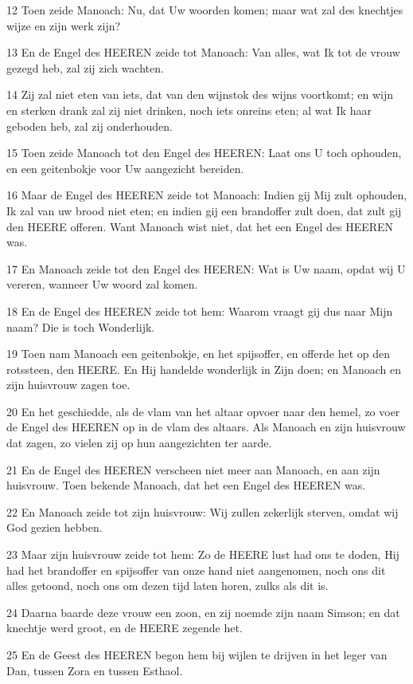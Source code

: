 \par 12 Toen zeide Manoach: Nu, dat Uw woorden komen; maar wat zal des knechtjes wijze en zijn werk zijn?
\par 13 En de Engel des HEEREN zeide tot Manoach: Van alles, wat Ik tot de vrouw gezegd heb, zal zij zich wachten.
\par 14 Zij zal niet eten van iets, dat van den wijnstok des wijns voortkomt; en wijn en sterken drank zal zij niet drinken, noch iets onreins eten; al wat Ik haar geboden heb, zal zij onderhouden.
\par 15 Toen zeide Manoach tot den Engel des HEEREN: Laat ons U toch ophouden, en een geitenbokje voor Uw aangezicht bereiden.
\par 16 Maar de Engel des HEEREN zeide tot Manoach: Indien gij Mij zult ophouden, Ik zal van uw brood niet eten; en indien gij een brandoffer zult doen, dat zult gij den HEERE offeren. Want Manoach wist niet, dat het een Engel des HEEREN was.
\par 17 En Manoach zeide tot den Engel des HEEREN: Wat is Uw naam, opdat wij U vereren, wanneer Uw woord zal komen.
\par 18 En de Engel des HEEREN zeide tot hem: Waarom vraagt gij dus naar Mijn naam? Die is toch Wonderlijk.
\par 19 Toen nam Manoach een geitenbokje, en het spijsoffer, en offerde het op den rotssteen, den HEERE. En Hij handelde wonderlijk in Zijn doen; en Manoach en zijn huisvrouw zagen toe.
\par 20 En het geschiedde, als de vlam van het altaar opvoer naar den hemel, zo voer de Engel des HEEREN op in de vlam des altaars. Als Manoach en zijn huisvrouw dat zagen, zo vielen zij op hun aangezichten ter aarde.
\par 21 En de Engel des HEEREN verscheen niet meer aan Manoach, en aan zijn huisvrouw. Toen bekende Manoach, dat het een Engel des HEEREN was.
\par 22 En Manoach zeide tot zijn huisvrouw: Wij zullen zekerlijk sterven, omdat wij God gezien hebben.
\par 23 Maar zijn huisvrouw zeide tot hem: Zo de HEERE lust had ons te doden, Hij had het brandoffer en spijsoffer van onze hand niet aangenomen, noch ons dit alles getoond, noch ons om dezen tijd laten horen, zulks als dit is.
\par 24 Daarna baarde deze vrouw een zoon, en zij noemde zijn naam Simson; en dat knechtje werd groot, en de HEERE zegende het.
\par 25 En de Geest des HEEREN begon hem bij wijlen te drijven in het leger van Dan, tussen Zora en tussen Esthaol.


